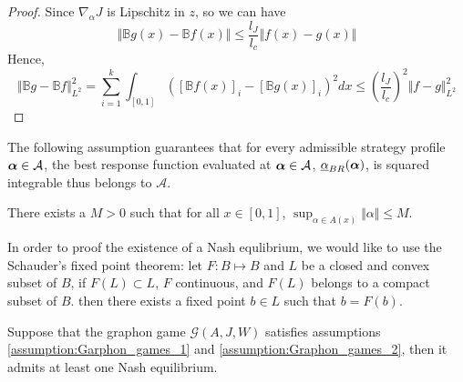 \begin{proof}
	Since $\nabla_\alpha J$ is Lipschitz in $z$, so we can have
	$$
		\Vert \mathbb{B}g(x) - \mathbb{B}f(x) \Vert \leq \frac{l_J}{l_c} \Vert f(x) - g(x) \Vert 
	$$
	Hence, 
	\begin{equation*}
		\Vert  \mathbb{B}g - \mathbb{B}f \Vert^2_{L^2} = \sum_{i=1}^k \int_{[0,1]} \left( [\mathbb{B}f(x)]_{i} - [\mathbb{B}g(x)]_{i} \right)^2 dx 
		\leq  \left( \frac{l_J}{l_c} \right)^2 \Vert f - g \Vert^2_{L^2}
	\end{equation*}
\end{proof}

{\color{red} The following assumption guarantees that for every admissible strategy profile $\boldsymbol{\alpha} \in \mathcal{A}$, the best response function evaluated at $\boldsymbol{\alpha} \in \mathcal{A}$, $\underline{\alpha}_{BR}(\boldsymbol{\alpha})$, is squared integrable thus belongs to $\mathcal{A}$. }
\begin{assumption}
	There exists a $M > 0$ such that for all $x \in [0,1]$, $ \sup_{\alpha \in A(x) } \Vert \alpha \Vert \leq M$.
\label{assumption:Graphon_games_2}
\end{assumption}


In order to proof the existence of a Nash equlibrium, we would like to use the Schauder's fixed point theorem: let $F: B \mapsto B$ and $L$ be a closed and convex subset of $B$, if $F(L) \subset L$, $F$ continuous, and $F(L)$ belongs to a compact subset of $B$. then there exists a fixed point $b \in L$ such that $b = F(b)$.


\begin{lemma}
 Suppose that the graphon game $\mathcal{G}(A,J,W)$ satisfies assumptions \ref{assumption:Garphon_games_1} and \ref{assumption:Graphon_games_2}, then it admits at least one Nash equilibrium.
\end{lemma}

